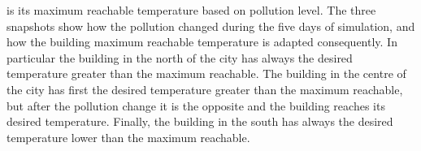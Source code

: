 % 
is its maximum reachable temperature based on pollution level.
The three snapshots show how the pollution changed during the five days of simulation, and how the building maximum reachable temperature is adapted consequently.
In particular the building in the north of the city has always the desired temperature greater than the maximum reachable. 
The building in the centre of the city has first the desired temperature greater than the maximum reachable, but after the pollution change it is the opposite and the building reaches its desired temperature.
Finally, the building in the south has always the desired temperature lower than the maximum reachable.


